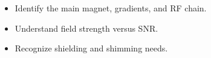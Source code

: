 \begin{objectives}
\begin{itemize}[leftmargin=1.4em,itemsep=2pt]
\item Identify the main magnet, gradients, and RF chain.
\item Understand field strength versus SNR.
\item Recognize shielding and shimming needs.
\end{itemize}
\end{objectives}
